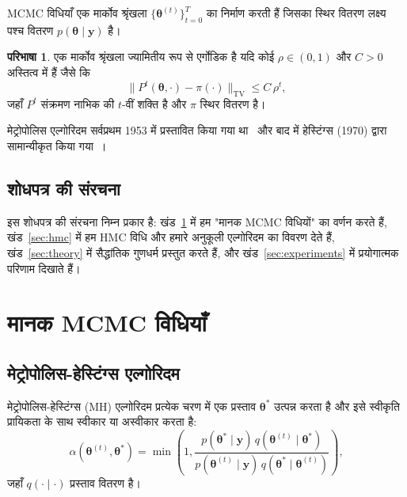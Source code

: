 \documentclass[12pt,a4paper]{article}
\theoremstyle{plain}
\theoremstyle{definition}
\newtheorem{definition}[theorem]{परिभाषा}
\theoremstyle{remark}
\begin{document}
MCMC विधियाँ एक मार्कोव श्रृंखला $\{\bm{\theta}^{(t)}\}_{t=0}^{T}$
का निर्माण करती हैं जिसका स्थिर वितरण लक्ष्य पश्च वितरण
$p(\bm{\theta} \mid \mathbf{y})$ है।

\begin{definition}
\label{def:ergodic}
एक मार्कोव श्रृंखला ज्यामितीय रूप से एर्गोडिक है यदि कोई
$\rho \in (0,1)$ और $C > 0$ अस्तित्व में हैं जैसे कि
\begin{equation}
\label{eq:ergodic}
\|P^t(\bm{\theta}, \cdot) - \pi(\cdot)\|_{\mathrm{TV}} \leq C \, \rho^t,
\end{equation}
जहाँ $P^t$ संक्रमण नाभिक की $t$-वीं शक्ति है और $\pi$ स्थिर
वितरण है।
\end{definition}

मेट्रोपोलिस एल्गोरिदम सर्वप्रथम 1953 में प्रस्तावित किया गया
था~\citep{metropolis1953} और बाद में हेस्टिंग्स (1970) द्वारा
सामान्यीकृत किया गया~\citep{hastings1970}।

\subsection{शोधपत्र की संरचना}

इस शोधपत्र की संरचना निम्न प्रकार है: खंड~\ref{sec:methods} में
हम "मानक MCMC विधियों" का वर्णन करते हैं, खंड~\ref{sec:hmc}
में हम HMC विधि और हमारे अनुकूली एल्गोरिदम का विवरण देते हैं,
खंड~\ref{sec:theory} में सैद्धांतिक गुणधर्म प्रस्तुत करते हैं,
और खंड~\ref{sec:experiments} में प्रयोगात्मक परिणाम दिखाते हैं।

\section{मानक MCMC विधियाँ}
\label{sec:methods}

\subsection{मेट्रोपोलिस-हेस्टिंग्स एल्गोरिदम}

मेट्रोपोलिस-हेस्टिंग्स (MH) एल्गोरिदम प्रत्येक चरण में एक
प्रस्ताव $\bm{\theta}^*$ उत्पन्न करता है और इसे स्वीकृति
प्रायिकता के साथ स्वीकार या अस्वीकार करता है:
\begin{equation}
\label{eq:mh_accept}
\alpha(\bm{\theta}^{(t)}, \bm{\theta}^*) = \min\!\left(1, \frac{p(\bm{\theta}^* \mid \mathbf{y}) \, q(\bm{\theta}^{(t)} \mid \bm{\theta}^*)}{p(\bm{\theta}^{(t)} \mid \mathbf{y}) \, q(\bm{\theta}^* \mid \bm{\theta}^{(t)})}\right),
\end{equation}
जहाँ $q(\cdot \mid \cdot)$ प्रस्ताव वितरण है।
\end{document}
